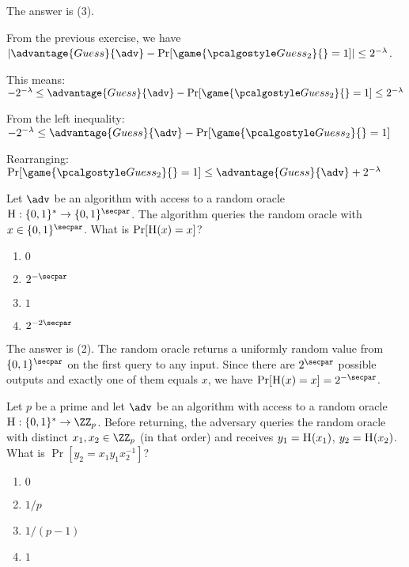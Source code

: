 \ifsolutions
\begin{mysolution}
  The answer is (3).
  
  From the previous exercise, we have $|\advantage{Guess}{\adv} - \Pr[\game{\algo{Guess}_2}{} = 1]| \leq 2^{-\lambda}$.
  
  This means:
  $-2^{-\lambda} \leq \advantage{Guess}{\adv} - \Pr[\game{\algo{Guess}_2}{} = 1] \leq 2^{-\lambda}$
  
  From the left inequality:
  $-2^{-\lambda} \leq \advantage{Guess}{\adv} - \Pr[\game{\algo{Guess}_2}{} = 1]$
  
  Rearranging:
  $\Pr[\game{\algo{Guess}_2}{} = 1] \leq \advantage{Guess}{\adv} + 2^{-\lambda}$
\end{mysolution}
\fi

\begin{exercise}
  Let $\adv$ be an algorithm with access to a random oracle $\pcoracle{H}: \{0,1\}^* \to \{0,1\}^\secpar$.
  The algorithm queries the random oracle with $x \in \{0,1\}^\secpar$.
  What is $\Pr[{\normalfont\textsc{H}}(x) = x]$?
  \begin{enumerate}
    \item $0$
    \item $2^{-\secpar}$
    \item $1$
    \item $2^{-2\secpar}$
  \end{enumerate}
\end{exercise}

\ifsolutions
\begin{mysolution}
  The answer is (2).
  The random oracle returns a uniformly random value from $\{0,1\}^\secpar$ on the first query to any input.
  Since there are $2^\secpar$ possible outputs and exactly one of them equals $x$, we have $\Pr[\pcoracle{H}(x) = x] = 2^{-\secpar}$.
\end{mysolution}
\fi

\begin{exercise}
  Let $p$ be a prime and let $\adv$ be an algorithm with access to a random oracle $\pcoracle{H}: \{0,1\}^* \to \ZZ_p$.
  Before returning, the adversary queries the random oracle with distinct $x_1, x_2 \in \ZZ_p$ (in that order) and receives $y_1 = {\normalfont\textsc{H}}(x_1)$, $y_2 = {\normalfont\textsc{H}}(x_2)$.
  What is $\Pr[y_2 = x_1 y_1 x_2^{-1}]$?
  \begin{enumerate}
    \item $0$
    \item $1/p$
    \item $1/(p-1)$
    \item $1$
  \end{enumerate}
\end{exercise}

